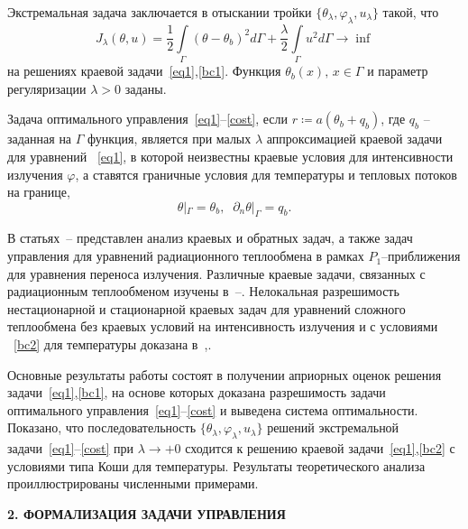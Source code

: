 \documentclass[12pt]{article}
\begin{document}
    Экстремальная задача заключается в отыскании тройки
    $\{\theta_\lambda,\varphi_\lambda,u_\lambda\}$ такой, что
    \begin{equation}
        \label{cost}
        J_\lambda(\theta, u) = \frac{1}{2}\int\limits_\Gamma (\theta - \theta_b)^2 d\Gamma
        + \frac{\lambda}{2}\int\limits_\Gamma u^2 d\Gamma \rightarrow\inf
    \end{equation}
    на решениях краевой задачи~\eqref{eq1},\eqref{bc1}.
    Функция $\theta_b(x),\, x\in\Gamma$  и параметр регуляризации $\lambda>0$ заданы.

    Задача оптимального управления~\eqref{eq1}--\eqref{cost}, если
    $r\coloneqq a(\theta_b+q_b)$, где $q_b$ -- заданная на $\Gamma$ функция,
    является при малых $\lambda$ аппроксимацией краевой задачи для уравнений ~\eqref{eq1}, в которой
    неизвестны краевые условия для интенсивности излучения $\varphi$, а ставятся
    граничные условия для температуры и тепловых потоков на границе,
    \begin{equation}
        \label{bc2}
        \theta|_\Gamma = \theta_b,\;\;
        \partial_n\theta|_\Gamma = q_b.
    \end{equation}


    В статьях~\cite{Pinnau07}--\cite{JMAA-19} представлен анализ краевых и обратных задач, а также задач управления
    для уравнений радиационного теплообмена в рамках $P_1$--приближения для уравнения переноса излучения.
    Различные краевые задачи, связанных с радиационным теплообменом изучены в~\cite{AmosA05}--\cite{Amosov18}.
    Нелокальная разрешимость нестационарной и стационарной краевых задач для уравнений сложного теплообмена
    без краевых условий на интенсивность излучения и с условиями ~\eqref{bc2} для температуры
    доказана в~\cite{CNSNS19},\cite{CMMP20}.


    Основные результаты работы состоят в получении априорных оценок
    решения задачи~\eqref{eq1},\eqref{bc1}, на основе которых
    доказана разрешимость задачи оптимального управления~\eqref{eq1}--\eqref{cost} и выведена система оптимальности.
    Показано, что последовательность $\{\theta_\lambda,\varphi_\lambda,u_\lambda\}$ решений
    экстремальной задачи~\eqref{eq1}--\eqref{cost} при $\lambda\to +0$
    сходится к решению краевой задачи~\eqref{eq1},\eqref{bc2} с условиями типа Коши для температуры.
    Результаты теоретического анализа проиллюстрированы численными примерами.


    \begin{center}
        \textbf{2. ФОРМАЛИЗАЦИЯ ЗАДАЧИ УПРАВЛЕНИЯ}
    \end{center}
\end{document}
